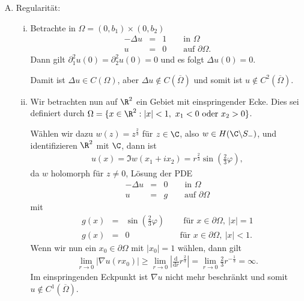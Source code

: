 \begin{enumerate}[B)]
    \item
	Regularität:
	\begin{enumerate}[i)]
	    \item
		Betrachte in $\Omega = (0, b_1) \times (0, b_2)$
		\begin{eqnarray*}
		    -\Delta u &=& 1 \qquad \text{in } \Omega \\
		    u &=& 0 \qquad \text{auf } \partial\Omega.
		\end{eqnarray*}
		Dann gilt $\partial_1^2 u(0) = \partial_2^2 u(0) = 0$
		und es folgt $\Delta u(0) = 0$.

        Damit ist $\Delta u \in C(\Omega)$, aber
		$\Delta u\not\in C(\overline \Omega)$ und somit ist
        $u\not\in C^2(\overline\Omega)$.
	    \item
		Wir betrachten nun auf $\R^2$ ein Gebiet mit einspringender Ecke.
        Dies sei definiert durch
        $\Omega = \{x\in \R^2: |x| < 1, \ x_1 < 0 \text{ oder } x_2 > 0\}$.

        Wählen wir dazu $w(z) =  z^\frac{2}{3}$ für
        $z\in \C$, also $w \in H(\C \backslash S_-)$, und identifizieren $\R^2$ mit $\C$, dann ist
        \begin{eqnarray*}
            u(x) = \Im w(x_1 + i x_2) = r^\frac{2}{3} \sin\left(\frac{2}{3}
            \varphi\right),
        \end{eqnarray*}
        da $w$ holomorph für $z \neq 0$, Lösung der PDE
		\begin{eqnarray*}
		    -\Delta u &=& 0 \qquad \text{in } \Omega \\
		    u &=& g \qquad \text{auf } \partial\Omega
		\end{eqnarray*}
		mit
		\begin{eqnarray*}
		    g(x) &=& \sin\left(\frac{2}{3} \varphi\right) \qquad \ \text{für }
                      x\in \partial\Omega, \ |x| = 1 \\
		    g(x) &=& 0 \qquad \qquad \qquad \text{für } x \in \partial\Omega,
                    \ |x| < 1.
		\end{eqnarray*}
		Wenn wir nun ein $x_0 \in \partial \Omega$ mit $|x_0| = 1$ wählen,
        dann gilt
		\begin{eqnarray*}
		    \lim_{r \to 0} |\nabla u(r x_0)| \ge \lim_{r \to 0}
		    \left|\frac{\mathrm d}{\mathrm d r} r^\frac{2}{3}\right| =
            \lim_{r \to 0} \frac{2}{3} r^{-\frac{1}{3}} = \infty.
		\end{eqnarray*}
        Im einspringenden Eckpunkt ist $\nabla u$ nicht mehr beschränkt und
        somit $u \not\in C^1(\overline\Omega)$.
	\end{enumerate}
\end{enumerate}


